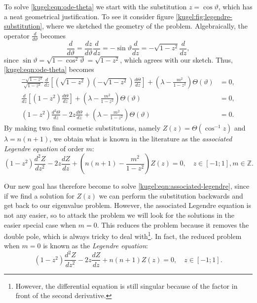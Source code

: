 To solve \eqref{kugel:eqn:ode-theta} we start with the substitution $z = \cos
\vartheta$, which has a neat geometrical justification. To see it consider
figure \ref{kugel:fig:legendre-substitution}, where we sketched the geometry of
the problem. Algebraically, the operator $\frac{d}{d \vartheta}$ becomes
\begin{equation*}
    \frac{d}{d \vartheta}
    = \frac{dz}{d \vartheta}\frac{d}{dz}
    = -\sin \vartheta \frac{d}{dz}
    = -\sqrt{1-z^2} \frac{d}{dz},
\end{equation*} 
since $\sin \vartheta = \sqrt{1 - \cos^2 \vartheta} = \sqrt{1 - z^2}$, which
agrees with our sketch. Thus, \eqref{kugel:eqn:ode-theta} becomes 
\begin{align*}
  \frac{-\sqrt{1-z^2}}{\sqrt{1-z^2}} \frac{d}{dz} \left[
    \left(\sqrt{1-z^2}\right) \left(-\sqrt{1-z^2}\right) \frac{d \Theta}{dz}
  \right]
  + \left( \lambda - \frac{m^2}{1 - z^2} \right)\Theta(\vartheta) &= 0,
  \\
  \frac{d}{dz} \left[ (1-z^2) \frac{d \Theta}{dz} \right]
  + \left( \lambda - \frac{m^2}{1 - z^2} \right)\Theta(\vartheta) &= 0,
  \\
  (1-z^2)\frac{d^2 \Theta}{dz} - 2z\frac{d \Theta}{dz}
  + \left( \lambda - \frac{m^2}{1 - z^2} \right)\Theta(\vartheta) &= 0.
\end{align*}
By making two final cosmetic substitutions, namely $Z(z) = \Theta(\cos^{-1}z)$
and $\lambda = n(n+1)$, we obtain what is known in the literature as the
\emph{associated Legendre equation} of order $m$:
\nocite{olver_introduction_2013}
\begin{equation} \label{kugel:eqn:associated-legendre}
  (1 - z^2)\frac{d^2 Z}{dz^2}
  - 2z\frac{d Z}{dz}
  + \left( n(n + 1) - \frac{m^2}{1 - z^2} \right) Z(z) = 0,
  \quad
  z \in [-1; 1], m \in \mathbb{Z}.
\end{equation}

Our new goal has therefore become to solve
\eqref{kugel:eqn:associated-legendre}, since if we find a solution for $Z(z)$ we
can perform the substitution backwards and get back to our eigenvalue problem.
However, the associated Legendre equation is not any easier, so to attack the
problem we will look for the solutions in the easier special case when $m = 0$.
This reduces the problem because it removes the double pole, which is always
tricky to deal with\footnote{However, the differential equation is still
singular because of the factor in front of the second derivative.}. In fact, the
reduced problem when $m = 0$ is known as the \emph{Legendre equation}:
\begin{equation} \label{kugel:eqn:legendre}
  (1 - z^2)\frac{d^2 Z}{dz^2}
  - 2z\frac{d Z}{dz}
  + n(n + 1) Z(z) = 0,
  \quad
  z \in [-1; 1].
\end{equation}

